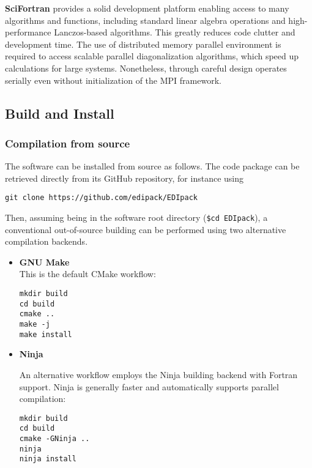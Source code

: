 \documentclass[edipack_sp.tex]{subfiles}
\begin{document}
{\bf SciFortran} provides a solid development platform enabling access to
many algorithms and functions, including standard linear algebra
operations and high-performance Lanczos-based algorithms. This
greatly reduces code clutter and development time.
The use of distributed memory parallel environment 
is required to access scalable parallel diagonalization algorithms,
which speed up calculations for large systems. Nonetheless, through careful design \NAME operates serially even without initialization of the MPI framework. 

\subsection{Build and Install}\label{sSecInstallBuildInstall}
\subsubsection{Compilation from source}
The software can be installed from source as follows. The code package can
be retrieved directly from its GitHub repository, for instance using
\begin{lstlisting}[style=mybash,numbers=none]
git clone https://github.com/edipack/EDIpack 
\end{lstlisting}
Then, assuming being in the software root directory ({\tt \$cd EDIpack}), a conventional out-of-source building can be performed using two alternative compilation backends.

\begin{itemize}
  \item {\bf GNU Make}\\
This is the default CMake workflow:
\begin{lstlisting}[style=mybash,numbers=none]
mkdir build
cd build
cmake ..
make -j
make install
\end{lstlisting}


\item{\bf Ninja}

An alternative workflow employs the Ninja building backend with
Fortran support. Ninja is generally faster and automatically supports
parallel compilation:
\begin{lstlisting}[style=mybash,numbers=none]
mkdir build
cd build
cmake -GNinja ..
ninja
ninja install
\end{lstlisting}
\end{itemize}
\end{document}
